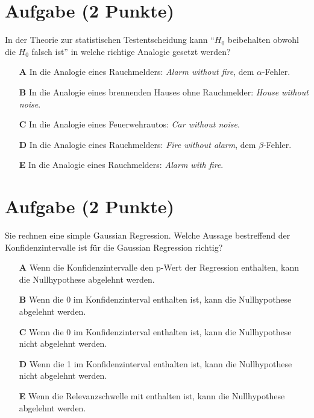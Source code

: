 \documentclass[a4paper, 10pt]{scrartcl}\usepackage[]{graphicx}\usepackage[]{xcolor}
\begin{document}
\section{Aufgabe \hfill (2 Punkte)}



In der Theorie zur statistischen Testentscheidung kann "`$H_0$ beibehalten obwohl die $H_0$ falsch ist"'
in welche richtige Analogie gesetzt werden?



\begin{enumerate}
\item [\textbf{A} \msquare] In die Analogie eines Rauchmelders: \textit{Alarm without fire}, dem $\alpha$-Fehler.
\item [\textbf{B} \msquare] In die Analogie eines brennenden Hauses ohne Rauchmelder: \textit{House without noise}.
\item [\textbf{C} \msquare] In die Analogie eines Feuerwehrautos: \textit{Car without noise}.
\item [\textbf{D} \msquare] In die Analogie eines Rauchmelders: \textit{Fire without alarm}, dem $\beta$-Fehler.
\item [\textbf{E} \msquare] In die Analogie eines Rauchmelders: \textit{Alarm with fire}.
\end{enumerate}

\section{Aufgabe \hfill (2 Punkte)}



Sie rechnen eine simple Gaussian Regression. Welche Aussage bestreffend der
Konfidenzintervalle ist f{\"u}r die Gaussian Regression richtig?



\begin{enumerate}
\item [\textbf{A} \msquare] Wenn die Konfidenzintervalle den p-Wert der Regression enthalten, kann die Nullhypothese abgelehnt werden.
\item [\textbf{B} \msquare] Wenn die 0 im Konfidenzinterval enthalten ist, kann die Nullhypothese abgelehnt werden.
\item [\textbf{C} \msquare] Wenn die 0 im Konfidenzinterval enthalten ist, kann die Nullhypothese nicht abgelehnt werden.
\item [\textbf{D} \msquare] Wenn die 1 im Konfidenzinterval enthalten ist, kann die Nullhypothese nicht abgelehnt werden.
\item [\textbf{E} \msquare] Wenn die Relevanzschwelle mit enthalten ist, kann die Nullhypothese abgelehnt werden.
\end{enumerate}
\end{document}
